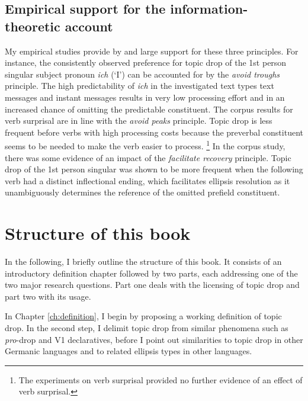 \subsection{Empirical support for the information-theoretic account}
My empirical studies provide by and large support for these three principles.
For instance, the consistently observed preference for topic drop of the 1st person singular subject pronoun \textit{ich} (`I') can be accounted for by the \textit{avoid troughs} principle.
The high predictability  of \textit{ich} in the investigated text types  text messages and instant messages results in very low processing effort  and in an increased chance of omitting the predictable constituent.
The corpus results for verb surprisal are in line with the \textit{avoid peaks} principle.
Topic drop is less frequent before verbs with high processing  costs because the preverbal constituent seems to be needed to make the verb easier to process.%
\footnote{The experiments on verb surprisal provided no further evidence of an effect of verb surprisal.}
%
In the corpus study, there was some evidence of an impact of the \textit{facilitate recovery} principle.
Topic drop of the 1st person singular was shown to be more frequent when the following verb had a distinct inflectional ending, which facilitates ellipsis resolution as it unambiguously determines the reference of the omitted prefield constituent.


\section{Structure of this book}
In the following, I briefly outline the structure of this book.
It consists of an introductory definition chapter followed by two parts, each addressing one of the two major research questions.
Part one deals with the licensing of topic drop and part two with its usage.

In Chapter \ref{ch:definition}, I begin by proposing a working definition of topic drop.
In the second step, I delimit topic drop from similar phenomena such as \textit{pro}-drop and V1 declaratives, before I point out similarities to topic drop in other Germanic languages and to related ellipsis types in other languages.

